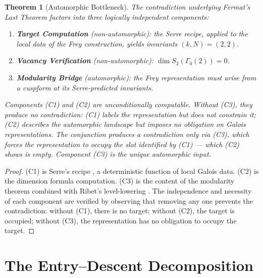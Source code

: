 \documentclass[12pt]{amsart}
\newtheorem{theorem}{Theorem}[section]
\theoremstyle{definition}
\theoremstyle{remark}
\begin{document}
\begin{theorem}[Automorphic Bottleneck]\label{thm:bottleneck}
The contradiction underlying Fermat's Last Theorem factors into three logically independent components:

\begin{enumerate}[label=(C\arabic*)]
\item \textbf{Target Computation} (non-automorphic): the Serre recipe, applied to the local data of the Frey construction, yields invariants $(k, N) = (2, 2)$.
\item \textbf{Vacancy Verification} (non-automorphic): $\dim S_2(\Gamma_0(2)) = 0$.
\item \textbf{Modularity Bridge} (automorphic): the Frey representation must arise from a cuspform at its Serre-predicted invariants.
\end{enumerate}

Components (C1) and (C2) are unconditionally computable. Without (C3), they produce no contradiction: (C1) labels the representation but does not constrain it; (C2) describes the automorphic landscape but imposes no obligation on Galois representations. The conjunction produces a contradiction only via (C3), which forces the representation to occupy the slot identified by (C1) --- which (C2) shows is empty. Component (C3) is the unique automorphic input.
\end{theorem}

\begin{proof}
(C1) is Serre's recipe \cite{Serre87}, a deterministic function of local Galois data. (C2) is the dimension formula computation. (C3) is the content of the modularity theorem \cite{Wiles, TW} combined with Ribet's level-lowering \cite{Ribet90}. The independence and necessity of each component are verified by observing that removing any one prevents the contradiction: without (C1), there is no target; without (C2), the target is occupied; without (C3), the representation has no obligation to occupy the target.
\end{proof}

\section{The Entry--Descent Decomposition}
\label{sec:entry-descent}
\end{document}
